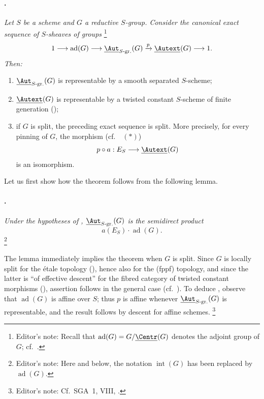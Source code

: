 \paragraph{.}
\emph{Let \(S\) be a scheme and \(G\) a reductive \(S\)-group. Consider
the canonical exact sequence of \(S\)-sheaves of groups}
\footnote{Editor's note: Recall that
\(\operatorname{ad}(G)=G/\underline{\Centr}(G)\) denotes the adjoint
group of \(G\); cf.\ .}
\[
  1\longrightarrow \operatorname{ad}(G)
  \longrightarrow \underline{\Aut}_{S\text{-}\mathrm{gr.}}(G)
  \xrightarrow{p}\underline{\Autext}(G)
  \longrightarrow 1.
\]
\emph{Then:}
\begin{enumerate}
\item[\SGAInlineRefTarget{sga3:xxiv:1.3:item:i}(i)] \(\underline{\Aut}_{S\text{-}\mathrm{gr.}}(G)\) is
  representable by a smooth separated \(S\)-scheme;
\item[\SGAInlineRefTarget{sga3:xxiv:1.3:item:ii}(ii)] \(\underline{\Autext}(G)\) is representable by a twisted
  constant \(S\)-scheme of finite generation \textup{()};
\item[\SGAInlineRefTarget{sga3:xxiv:1.3:item:iii}(iii)] if \(G\) is split, the preceding exact sequence is split.
  More precisely, for every pinning of \(G\), the morphism
  \textup{(cf.\ ~\((*)\))}
  \[
    p\circ a:E_S\longrightarrow\underline{\Autext}(G)
  \]
  is an isomorphism.
\end{enumerate}

Let us first show how the theorem follows from the following lemma.

\paragraph{.}
\emph{Under the hypotheses of \textup{},
\(\underline{\Aut}_{S\text{-}\mathrm{gr.}}(G)\) is the semidirect
product}
\[
  a(E_S)\cdot\operatorname{ad}(G).
\]
\footnote{Editor's note: Here and below, the notation
\(\operatorname{int}(G)\) has been replaced by
\(\operatorname{ad}(G)\).}

The lemma immediately implies the theorem when \(G\) is split. Since
\(G\) is locally split for the étale topology \textup{()}, hence also for the \textup{(fppf)} topology, and since the
latter is ``of effective descent'' for the fibred category of twisted
constant morphisms \textup{()}, assertion \textup{}
follows in the general case \textup{(cf.\ )}. To deduce
\textup{}, observe that \(\operatorname{ad}(G)\) is affine over
\(S\); thus \(p\) is affine whenever
\(\underline{\Aut}_{S\text{-}\mathrm{gr.}}(G)\) is representable, and
the result follows by descent for affine schemes.
\footnote{Editor's note: Cf.\ SGA~1, VIII, .}

